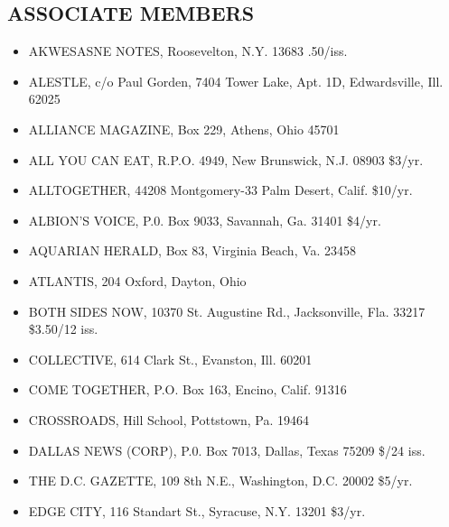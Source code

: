 \documentclass[11pt,twoside,a4paper]{book}
\begin{document}
\begin{minipage}[t]{0.20\textwidth}
\subsection*{ASSOCIATE MEMBERS}
\begin{scriptsize}
\begin{itemize}
	\item[] AKWESASNE NOTES, Roosevelton, N.Y. 13683 .50/iss. 
	\item[] ALESTLE, c/o Paul Gorden, 7404 Tower Lake, Apt. 1D, Edwardsville,	Ill. 62025 
	\item[] ALLIANCE MAGAZINE, Box 229, Athens, Ohio 45701
	\item[] ALL YOU CAN EAT, R.P.O. 4949, New Brunswick, N.J. 08903 \$3/yr. 
	\item[] ALLTOGETHER, 44208 Montgomery-33 Palm Desert, Calif. \$10/yr. 
	\item[] ALBION'S VOICE, P.0. Box 9033, Savannah, Ga. 31401 \$4/yr. 
	\item[] AQUARIAN HERALD, Box 83, Virginia Beach, Va. 23458 
	\item[] ATLANTIS, 204 Oxford, Dayton, Ohio
 	\item[] BOTH SIDES NOW, 10370 St. Augustine Rd., Jacksonville, Fla. 33217	\$3.50/12 iss. 
	\item[] COLLECTIVE, 614 Clark St., Evanston, Ill. 60201 
	\item[] COME TOGETHER, P.O. Box 163, Encino, Calif. 91316 
	\item[] CROSSROADS, Hill School, Pottstown, Pa. 19464 
	\item[] DALLAS NEWS (CORP), P.0. Box 7013, 	Dallas, Texas 75209 \$/24 iss. 
	\item[] THE D.C. GAZETTE, 109 8th N.E., Washington, D.C. 20002 \$5/yr. 
	\item[] EDGE CITY, 116 Standart St., Syracuse, N.Y. 13201 \$3/yr. 
\end{itemize}
\end{scriptsize}
\end{minipage}\hfill
\end{document}
